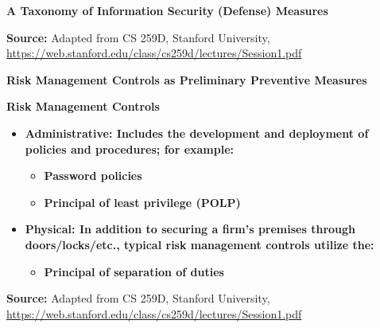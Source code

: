 \documentclass[aspectratio=169]{beamer} %
\begin{document}
\begin{frame}{\textbf{A Taxonomy of Information Security (Defense) Measures}}
	\centering
	
	\vspace{\baselineskip}
	
	
	
	\EndofPage
	
	\scriptsize{\textbf{Source:} Adapted from CS 259D, Stanford University, \url{https://web.stanford.edu/class/cs259d/lectures/Session1.pdf}}
	
	\vspace{0.5\baselineskip}
\end{frame}

\begin{frame}{\textbf{Risk Management Controls as Preliminary Preventive Measures}}
	
	\vspace{\baselineskip}
	
	\begin{block}{\textbf{Risk Management Controls}}
		\begin{itemize}
			\item<1-3> \textbf{\textcolor{miamired}{Administrative:} Includes the development and deployment of policies and procedures; for example:}
			\begin{itemize}
				\item<2> \textbf{Password policies}
				\item<3> \textbf{Principal of least privilege (POLP)}
			\end{itemize}
			
			\item<4> \textbf{\textcolor{miamired}{Physical:} In addition to securing a firm's premises through doors/locks/etc., typical risk management controls utilize the:}
			\begin{itemize}
				\item<4> \textbf{Principal of separation of duties}
			\end{itemize} 
		\end{itemize}
	\end{block}
	
	\EndofPage
	
	\centering \scriptsize{\textbf{Source:} Adapted from CS 259D, Stanford University, \url{https://web.stanford.edu/class/cs259d/lectures/Session1.pdf}}
	
	\vspace{0.5\baselineskip}
\end{frame}
\end{document}
